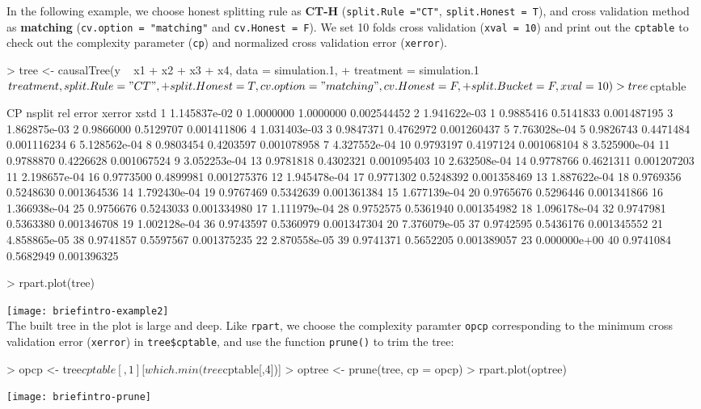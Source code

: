 \documentclass[11pt]{article}
\renewenvironment{Schunk}{\vspace{\topsep}}{\vspace{\topsep}}
\begin{document}
In the following example, we choose honest splitting rule as \textbf{CT-H} (\texttt{split.Rule ="CT"}, \texttt{split.Honest = T}), and cross validation method as \textbf{matching} (\texttt{cv.option = "matching"} and \texttt{cv.Honest = F}). We set 10 folds cross validation (\texttt{xval = 10}) and print out the \texttt{cptable} to check out the complexity parameter (\texttt{cp}) and normalized cross validation error (\texttt{xerror}).
\begin{Schunk}
\begin{Sinput}
> tree <- causalTree(y ~ x1 + x2 + x3 + x4, data = simulation.1,
+                   treatment = simulation.1$treatment, split.Rule = "CT",
+                   split.Honest = T, cv.option = "matching", cv.Honest = F,
+                   split.Bucket = F, xval = 10)
> tree$cptable
\end{Sinput}
\begin{Soutput}
             CP nsplit rel error    xerror        xstd
1  1.145837e-02      0 1.0000000 1.0000000 0.002544452
2  1.941622e-03      1 0.9885416 0.5141833 0.001487195
3  1.862875e-03      2 0.9866000 0.5129707 0.001411806
4  1.031403e-03      3 0.9847371 0.4762972 0.001260437
5  7.763028e-04      5 0.9826743 0.4471484 0.001116234
6  5.128562e-04      8 0.9803454 0.4203597 0.001078958
7  4.327552e-04     10 0.9793197 0.4197124 0.001068104
8  3.525900e-04     11 0.9788870 0.4226628 0.001067524
9  3.052253e-04     13 0.9781818 0.4302321 0.001095403
10 2.632508e-04     14 0.9778766 0.4621311 0.001207203
11 2.198657e-04     16 0.9773500 0.4899981 0.001275376
12 1.945478e-04     17 0.9771302 0.5248392 0.001358469
13 1.887622e-04     18 0.9769356 0.5248630 0.001364536
14 1.792430e-04     19 0.9767469 0.5342639 0.001361384
15 1.677139e-04     20 0.9765676 0.5296446 0.001341866
16 1.366938e-04     25 0.9756676 0.5243033 0.001334980
17 1.111979e-04     28 0.9752575 0.5361940 0.001354982
18 1.096178e-04     32 0.9747981 0.5363380 0.001346708
19 1.002128e-04     36 0.9743597 0.5360979 0.001347304
20 7.376079e-05     37 0.9742595 0.5436176 0.001345552
21 4.858865e-05     38 0.9741857 0.5597567 0.001375235
22 2.870558e-05     39 0.9741371 0.5652205 0.001389057
23 0.000000e+00     40 0.9741084 0.5682949 0.001396325
\end{Soutput}
\begin{Sinput}
> rpart.plot(tree)
\end{Sinput}
\end{Schunk}
\texttt{[image: briefintro-example2]}
\\
The built tree in the plot is large and deep. Like \texttt{rpart}, we choose the complexity paramter \texttt{opcp} corresponding to the minimum cross validation error (\texttt{xerror}) in \texttt{tree\$cptable}, and use the function \texttt{prune()} to trim the tree:
\begin{Schunk}
\begin{Sinput}
> opcp <- tree$cptable[, 1][which.min(tree$cptable[,4])]
> optree <- prune(tree, cp = opcp)
> rpart.plot(optree)
\end{Sinput}
\end{Schunk}
\texttt{[image: briefintro-prune]}
\end{document}
